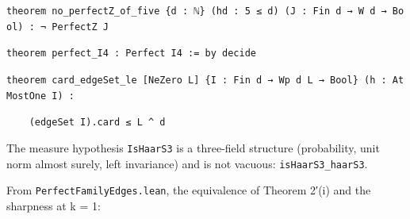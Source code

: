 \documentclass[11pt,a4paper]{article}
\theoremstyle{named}
\begin{document}
\begin{leancode}
\item \texttt{theorem\ \allowbreak{}no\_\allowbreak{}perfectZ\_\allowbreak{}of\_\allowbreak{}five\ \allowbreak{}\{d\ \allowbreak{}:\ \allowbreak{}ℕ\}\ \allowbreak{}(hd\ \allowbreak{}:\ \allowbreak{}5\ \allowbreak{}≤\ \allowbreak{}d)\ \allowbreak{}(J\ \allowbreak{}:\ \allowbreak{}Fin\ \allowbreak{}d\ \allowbreak{}→\ \allowbreak{}W\ \allowbreak{}d\ \allowbreak{}→\ \allowbreak{}Bool)\ \allowbreak{}:\ \allowbreak{}¬\ \allowbreak{}PerfectZ\ \allowbreak{}J}
\item \texttt{theorem\ \allowbreak{}perfect\_\allowbreak{}I4\ \allowbreak{}:\ \allowbreak{}Perfect\ \allowbreak{}I4\ \allowbreak{}:=\ \allowbreak{}by\ \allowbreak{}decide}
\item \texttt{theorem\ \allowbreak{}card\_\allowbreak{}edgeSet\_\allowbreak{}le\ \allowbreak{}[NeZero\ \allowbreak{}L]\ \allowbreak{}\{I\ \allowbreak{}:\ \allowbreak{}Fin\ \allowbreak{}d\ \allowbreak{}→\ \allowbreak{}Wp\ \allowbreak{}d\ \allowbreak{}L\ \allowbreak{}→\ \allowbreak{}Bool\}\ \allowbreak{}(h\ \allowbreak{}:\ \allowbreak{}AtMostOne\ \allowbreak{}I)\ \allowbreak{}:}
\item \texttt{\ \allowbreak{}\ \allowbreak{}\ \allowbreak{}\ \allowbreak{}(edgeSet\ \allowbreak{}I).\allowbreak{}card\ \allowbreak{}≤\ \allowbreak{}L\ \allowbreak{}\textasciicircum{}\ \allowbreak{}d}
\end{leancode}
The measure hypothesis \texttt{IsHaarS3} is a three-field structure (probability, unit norm almost surely, left invariance) and is not vacuous: \texttt{isHaarS3\_\allowbreak{}haarS3}.

From \texttt{PerfectFamilyEdges.\allowbreak{}lean}, the equivalence of Theorem 2′(i) and the sharpness at k = 1:
\end{document}
